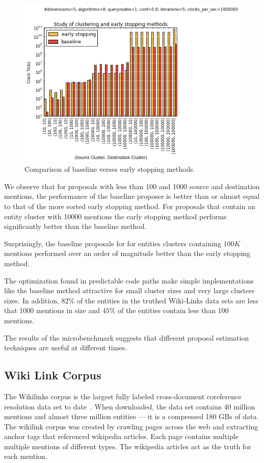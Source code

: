 \begin{figure}
\centering
\includegraphics[width=\columnwidth, clip=true,trim=0cm 0cm 0cm 1.2cm]{media/clustering-v-early-stopping.png}
\caption{Comparison of baseline verses early stopping methods.}
\label{fig:clustering-v-early-stopping}
\end{figure}

We observe that for proposals with less than 100 and 1000 source and
destination mentions, the performance of the baseline proposer is better than
or almost equal to that of the more sorted early stopping method.
For proposals that contain an entity cluster with 10000 mentions
the early stopping method performs significantly better than the baseline method.

Surprisingly, the baseline proposals for for entities clusters containing $100 K$ mentions
performed over an order of magnitude better than the early stopping method.

The optimization found in predictable code paths make simple implementations
like the baseline method attractive for small cluster sizes and very large clusters sizes.
In addition, $82\%$ of the entities in the truthed Wiki-Links data sets are less
that 1000 mentions in size and $45\%$ of the entities contain less than 100
mentions.

The results of the microbenchmark suggests that different proposal estimation
techniques are useful at different times.



\subsection{Wiki Link Corpus}

The Wikilinks corpus is the largest fully labeled cross-document coreference resolution data set to date~\cite{singh12:wiki-links}.
When downloaded, the data set contains 40 million mentions and almost three million entities --- it is a compressed 180 GBs of data.
The wikilink corpus was created by crawling pages across the web and extracting anchor tags that referenced wikipedia articles.
Each page contains multiple multiple mentions of different types.
The wikipedia articles act as the truth for each mention.

